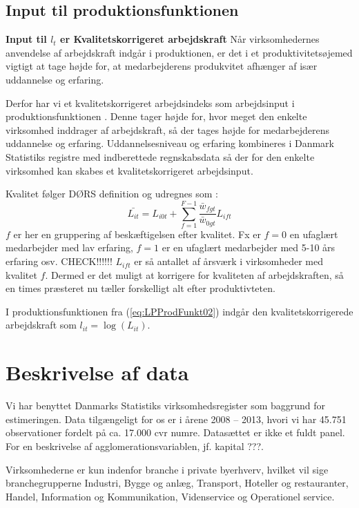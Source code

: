\subsection{Input til produktionsfunktionen}
\textbf{Input til $l_t$ er Kvalitetskorrigeret arbejdskraft}
Når virksomhedernes anvendelse af arbejdskraft indgår i produktionen, er det i et produktivitetsøjemed vigtigt at tage højde for, at medarbejderens produkvitet afhænger af især uddannelse og erfaring.

Derfor har vi et kvalitetskorrigeret arbejdsindeks som arbejdsinput i produktionsfunktionen \cite[s. 5]{dors2010baggrund}. Denne tager højde for, hvor meget den enkelte virksomhed inddrager af arbejdskraft, så der tages højde for medarbejderens uddannelse og erfaring. Uddannelsesniveau og erfaring kombineres i Danmark Statistiks registre med indberettede regnskabsdata så der for den enkelte virksomhed kan skabes et kvalitetskorrigeret arbejdsinput.

Kvalitet følger DØRS definition og udregnes som \cite[s. 5]{dors2010baggrund}:
\begin{equation}
	\bar{L_{it}} = 
	L_{i0t} + \sum_{f=1}^{F-1} \frac{\bar{w}_{fgt}}{\bar{w}_{0gt}} 
	L_{ift}
\end{equation}
$f$ er her en gruppering af beskæftigelsen efter kvalitet. Fx er $f=0$ en ufaglært medarbejder med lav erfaring, $f=1$ er en ufaglært medarbejder med 5-10 års erfaring osv. CHECK!!!!!!
$L_{ift}$ er så antallet af årsværk i virksomheder med kvalitet $f$. Dermed er det muligt at korrigere for kvaliteten af arbejdskraften, så en times præsteret nu tæller forskelligt alt efter produktivteten.

I produktionsfunktionen fra (\ref{eq:LPProdFunkt02}) indgår den kvalitetskorrigerede arbejdskraft som $l_{it} = \log(L_{it})$.  

\section{Beskrivelse af data}
Vi har benyttet Danmarks Statistiks virksomhedsregister som baggrund for estimeringen. Data tilgængeligt for os er i årene 2008 -- 2013, hvori vi har 45.751 observationer fordelt på ca. 17.000 cvr numre. Datasættet er ikke et fuldt panel. For en beskrivelse af agglomerationsvariablen, jf. kapital ???.

Virksomhederne er kun indenfor branche i private byerhverv, hvilket vil sige branchegrupperne Industri, Bygge og anlæg, Transport, Hoteller og restauranter, Handel, Information og Kommunikation, Videnservice og Operationel service.

